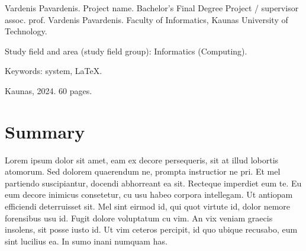 \thispagestyle{noNumber}
\pagebreak
Vardenis Pavardenis. Project name.
Bachelor's Final Degree Project /
supervisor assoc. prof. Vardenis Pavardenis. Faculty of Informatics, Kaunas University of Technology.

Study field and area (study field group): Informatics (Computing).

Keywords: system, LaTeX.

Kaunas, 2024. 60 pages.
\section*{Summary}
Lorem ipsum dolor sit amet, eam ex decore persequeris, sit at illud lobortis
atomorum. Sed dolorem quaerendum ne, prompta instructior ne pri. Et mel
partiendo suscipiantur, docendi abhorreant ea sit. Recteque imperdiet eum te.
Eu eum decore inimicus consetetur, cu usu habeo corpora intellegam. Ut antiopam
efficiendi deterruisset sit. Mel sint eirmod id, qui quot virtute id, dolor
nemore forensibus usu id. Fugit dolore voluptatum cu vim. An vix veniam graecis
insolens, sit posse iusto id. Ut vim ceteros percipit, id quo ubique recusabo,
eum sint lucilius ea. In sumo inani numquam has.
\pagebreak
